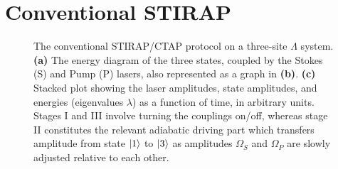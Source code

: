 \section{Conventional STIRAP}
\label{sec:conventional}

\begin{figure}[t]
\centering
\def\svgwidth{.7\linewidth}

\caption{The conventional STIRAP/CTAP protocol on a three-site $\Lambda$ system. \textbf{(a)} The energy diagram of the three states, coupled by the Stokes (S) and Pump (P) lasers, also represented as a graph in \textbf{(b)}. \textbf{(c)} Stacked plot showing the laser amplitudes, state amplitudes, and energies (eigenvalues $\lambda$) as a function of time, in arbitrary units. Stages I and III involve turning the couplings on/off, whereas stage II constitutes the relevant adiabatic driving part which transfers amplitude from state $\lvert1\rangle$ to $\lvert3\rangle$ as amplitudes $\Omega_S$ and $\Omega_P$ are slowly adjusted relative to each other. }
\label{fig:stirap}
\end{figure}


